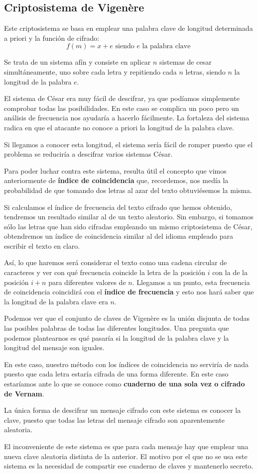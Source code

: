\subsection{Criptosistema de Vigenère}
Este criptosistema se basa en emplear una palabra clave de longitud determinada a priori y la función de cifrado:
\[f(m)=x+e \text{ siendo } e \text{ la palabra clave }\]

Se trata de un sistema afín y consiste en aplicar $n$ sistemas de cesar simultáneamente, uno sobre cada letra y repitiendo cada $n$ letras, siendo $n$ la longitud de la palabra $e$.

El sistema de César era muy fácil de descifrar, ya que podíamos simplemente comprobar todas las posibilidades. En este caso se complica un poco pero un análisis de frecuencia nos ayudaría a hacerlo fácilmente. La fortaleza del sistema radica en que el atacante no conoce a priori la longitud de la palabra clave.

Si llegamos a conocer esta longitud, el sistema sería fácil de romper puesto que el problema se reduciría a descifrar varios sistemas César.

Para poder luchar contra este sistema, resulta útil el concepto que vimos anteriormente de \textbf{índice de coincidencia} que, recordemos, nos medía la probabilidad de que tomando dos letras al azar del texto obtuviésemos la misma.


Si calculamos el índice de frecuencia del texto cifrado que hemos obtenido, tendremos un resultado similar al de un texto aleatorio. Sin embargo, si tomamos sólo las letras que han sido cifradas empleando un mismo criptosistema de César, obtendremos un índice de coincidencia similar al del idioma empleado para escribir el texto en claro.

Así, lo que haremos será considerar el texto como una cadena circular de caracteres y ver con qué frecuencia coincide la letra de la posición $i$ con la de la posición $i+n$ para diferentes valores de $n$. Llegamos a un punto, esta frecuencia de coincidencia coincidirá con el \textbf{índice de frecuencia} y esto nos hará saber que la longitud de la palabra clave era $n$.

Podemos ver que el conjunto de claves de Vigenère es la unión disjunta de todas las posibles palabras de todas las diferentes longitudes. Una pregunta que podemos plantearnos es qué pasaría si la longitud de la palabra clave y la longitud del mensaje son iguales.

En este caso, nuestro método con los índices de coincidencia no serviría de nada puesto que cada letra estaría cifrada de una forma diferente. En este caso estaríamos ante lo que se conoce como \textbf{cuaderno de una sola vez o cifrado de Vernam}.

La única forma de descifrar un mensaje cifrado con este sistema es conocer la clave, puesto que todas las letras del mensaje cifrado son aparentemente aleatoria.

El inconveniente de este sistema es que para cada mensaje hay que emplear una nueva clave aleatoria distinta de la anterior. El motivo por el que no se usa este sistema es la necesidad de compartir ese cuaderno de claves y mantenerlo secreto.

